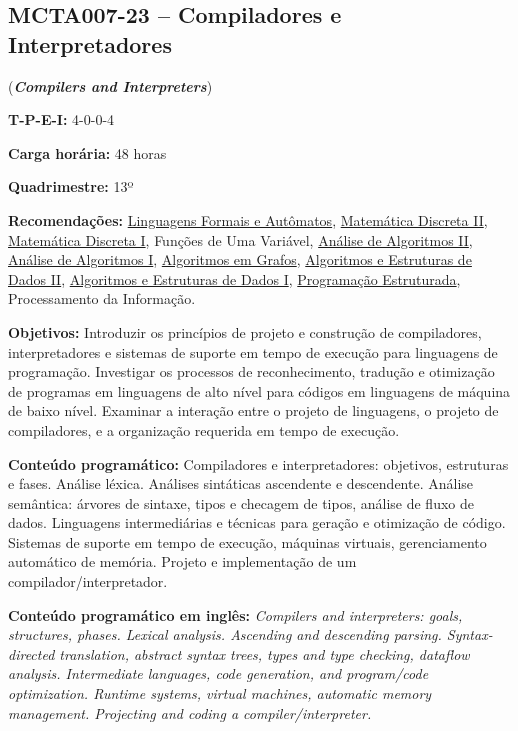 \documentclass[class=article, crop=false]{standalone}
\begin{document}
\subsection{MCTA007-23 -- Compiladores e Interpretadores}
\label{disc:compi}

(\textbf{\textit{Compilers and Interpreters}})

\begin{center}
    \begin{minipage}{0.85\textwidth}
        \textbf{T-P-E-I:} 4-0-0-4
        
        \textbf{Carga horária:} 48 horas
        
        \textbf{Quadrimestre:} 13º
        
        \textbf{Recomendações:} 
        \hyperref[disc:lfa]{Linguagens Formais e Autômatos},
        \hyperref[disc:mdII]{Matemática Discreta II},
        \hyperref[disc:mdI]{Matemática Discreta I},
        Funções de Uma Variável,
        \hyperref[disc:aaII]{Análise de Algoritmos II},
        \hyperref[disc:aaI]{Análise de Algoritmos I},
        \hyperref[disc:ag]{Algoritmos em Grafos},
        \hyperref[disc:aedII]{Algoritmos e Estruturas de Dados II},
        \hyperref[disc:aedI]{Algoritmos e Estruturas de Dados I},
        \hyperref[disc:pe]{Programação Estruturada},
        Processamento da Informação.
    \end{minipage}
\end{center}

\textbf{Objetivos:}
Introduzir os princípios de projeto e construção de compiladores, interpretadores e sistemas de suporte
em tempo de execução para linguagens de programação. Investigar os processos de reconhecimento, tradução 
e otimização de programas em linguagens de alto nível para códigos em linguagens de máquina de baixo nível.
Examinar a interação entre o projeto de linguagens, o projeto de compiladores, e a organização requerida em
tempo de execução.

\textbf{Conteúdo programático:}
Compiladores e interpretadores: objetivos, estruturas e fases.
Análise léxica. 
Análises sintáticas ascendente e descendente. 
Análise semântica: árvores de sintaxe, tipos e checagem de tipos, análise de fluxo de dados.
Linguagens intermediárias e técnicas para geração e otimização de código.
Sistemas de suporte em tempo de execução, máquinas virtuais, gerenciamento automático de memória.
Projeto e implementação de um compilador/interpretador.

\textbf{Conteúdo programático em inglês:}
\textit{
Compilers and interpreters: goals, structures, phases.
Lexical analysis.
Ascending and descending parsing.
Syntax-directed translation, abstract syntax trees, types and type checking, dataflow analysis.
Intermediate languages, code generation, and program/code optimization.
Runtime systems, virtual machines, automatic memory management.
Projecting and coding a compiler/interpreter.
}
\end{document}

